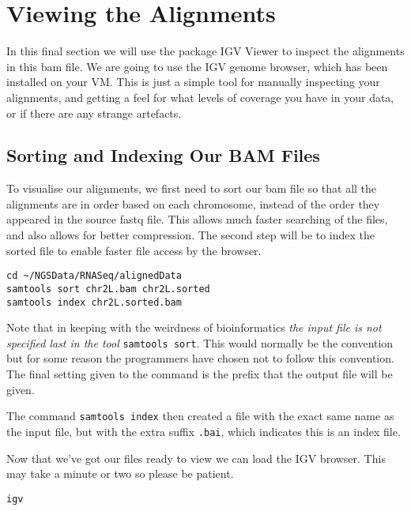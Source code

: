 \section{Viewing the Alignments}
In this final section we will use the package IGV Viewer to inspect the alignments in this bam file.
We are going to use the IGV genome browser, which has been installed on your VM.
This is just a simple tool for manually inspecting your alignments, and getting a feel for what levels of coverage you have in your data, or if there are any strange artefacts.

\subsection{Sorting and Indexing Our BAM Files}
\begin{note}
To visualise our alignments, we first need to sort our bam file so that all the alignments are in order based on each chromosome, instead of the order they appeared in the source fastq file.
This allows much faster searching of the files, and also allows for better compression.
The second step will be to index the sorted file to enable faster file access by the browser.
\end{note}

\begin{steps}
\begin{lstlisting}
cd ~/NGSData/RNASeq/alignedData
samtools sort chr2L.bam chr2L.sorted
samtools index chr2L.sorted.bam
\end{lstlisting}
\end{steps}

\begin{information}
Note that in keeping with the weirdness of bioinformatics \textit{the input file is not specified last in the tool} \texttt{samtools sort}.
This would normally be the convention but for some reason the programmers have chosen not to follow this convention.
The final setting given to the command is the prefix that the output file will be given. \\
\end{information}

The command \texttt{samtools index} then created a file with the exact same name as the input file, but with the extra suffix \texttt{.bai}, which indicates this is an index file.\\

\begin{steps}
Now that we've got our files ready to view we can load the IGV browser.
This may take a minute or two so please be patient.

\begin{lstlisting}
igv
\end{lstlisting}
\end{steps}

